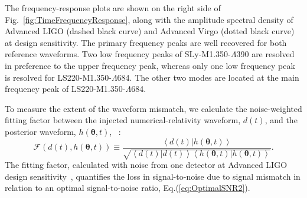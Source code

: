 \documentclass[../Thesis.tex]{subfiles}
\begin{document}
     The frequency-response plots  are shown on the right side of Fig.~\ref{fig:TimeFrequencyResponse}, along with the amplitude spectral density of Advanced LIGO (dashed black curve) and Advanced Virgo (dotted black curve) at design sensitivity. 
     The primary frequency peaks are well recovered for both reference waveforms. 
     Two low frequency peaks of SLy-M1.350-$\Lambda$390 are resolved in preference to the upper frequency peak, whereas only one low frequency peak is resolved for LS220-M1.350-$\Lambda$684. The other two modes are located at the main frequency peak of LS220-M1.350-$\Lambda$684.\par

     To measure the extent of the waveform mismatch, we calculate the noise-weighted fitting factor between the injected numerical-relativity waveform, $d(t)$, and the posterior waveform, $h(\boldsymbol{\theta},t)$, ~\cite{Apostolatos95}:
    \begin{equation}
    	\mathcal{F}(d(t),h(\boldsymbol{\theta},t))\equiv\frac{\left<d(t)|h(\boldsymbol{\theta},t)\right>}{\sqrt{\left<d(t)|d(t)\right>\left<h(\boldsymbol{\theta},t)|h(\boldsymbol{\theta},t)\right>}}.\label{eq:FF2}
    \end{equation}
    The fitting factor, calculated with noise from one detector at Advanced LIGO design sensitivity~\cite{PSD:aLIGO}, quantifies the loss in signal-to-noise due to signal mismatch in relation to an optimal signal-to-noise ratio, Eq.(\ref{eq:OptimalSNR2}). \par
 
\end{document}
